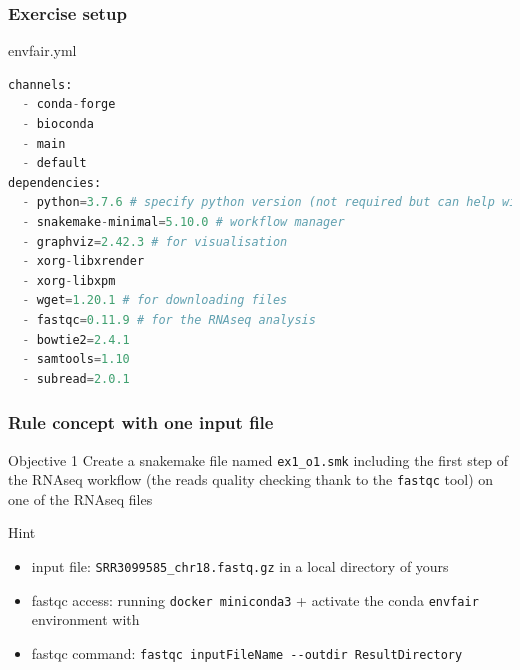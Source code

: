 \begin{frame}[containsverbatim]
\frametitle{Exercise setup}
\begin{exampleblock}{envfair.yml}
\begin{lstlisting}[language=python]
channels:
  - conda-forge
  - bioconda
  - main
  - default
dependencies:
  - python=3.7.6 # specify python version (not required but can help with downstream conflicts)
  - snakemake-minimal=5.10.0 # workflow manager
  - graphviz=2.42.3 # for visualisation
  - xorg-libxrender
  - xorg-libxpm
  - wget=1.20.1 # for downloading files
  - fastqc=0.11.9 # for the RNAseq analysis
  - bowtie2=2.4.1
  - samtools=1.10
  - subread=2.0.1
\end{lstlisting}
\end{exampleblock}
\end{frame}
\begin{frame}[containsverbatim]
\frametitle{Rule concept with one input file}
\begin{exampleblock}{Objective 1}
Create a snakemake file named \verb|ex1_o1.smk| including the first step of the RNAseq workflow (the reads quality checking thank to the \verb|fastqc| tool) on one of the RNAseq files
\end{exampleblock}
\begin{exampleblock}{Hint}
\begin{itemize}
    \item input file: \verb|SRR3099585_chr18.fastq.gz| in a local directory of yours
    \item \alert{fastqc access}: running \verb|docker miniconda3| + activate the conda \verb|envfair| environment with 
    \item fastqc command: \verb|fastqc inputFileName --outdir ResultDirectory|
\end{itemize}
\end{exampleblock}
\end{frame}
